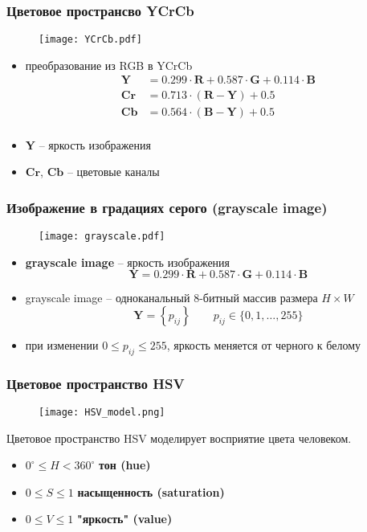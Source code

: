 \documentclass[
    12pt, 
    usepdftitle=false,
    aspectratio=1610
]{beamer}
\begin{document}
\begin{frame}
\frametitle{Цветовое пространсво YCrCb}
\begin{figure}
    \centering
    \texttt{[image: YCrCb.pdf]}
\end{figure}
\begin{itemize}
    \item преобразование из RGB в YCrCb
    \begin{align*}
        \mathbf{Y}  &= 0.299\cdot \mathbf{R} + 0.587\cdot \mathbf{G} + 0.114\cdot \mathbf{B} \\
        \mathbf{Cr} &= 0.713 \cdot (\mathbf{R} - \mathbf{Y}) + 0.5 \\
        \mathbf{Cb} &= 0.564 \cdot (\mathbf{B} - \mathbf{Y}) + 0.5 \\
    \end{align*}
    \item $\mathbf{Y}$ -- яркость изображения 
    \item $\mathbf{Cr}$, $\mathbf{Cb}$ -- цветовые каналы
\end{itemize}
\end{frame}

\begin{frame}
\frametitle{Изображение в градациях серого (grayscale image)}
\begin{figure}
    \centering
    \texttt{[image: grayscale.pdf]}
\end{figure}
\begin{itemize}
    \item \textbf{grayscale image} -- яркость изображения
    $$
        \mathbf{Y} = 0.299\cdot \mathbf{R} + 0.587\cdot \mathbf{G} + 0.114\cdot \mathbf{B}
    $$
    \item grayscale image -- одноканальный 8-битный массив размера $H\times W$
    $$
        \mathbf{Y}=\left\{p_{ij}\right\}\qquad
        p_{ij}\in\{0,1,\ldots,255\}
    $$
    \item при изменении $0\leqslant p_{ij}\leqslant 255$, яркость меняется от черного к белому
\end{itemize}
\end{frame}

\begin{frame}
\frametitle{Цветовое пространство HSV}
\begin{figure}
    \centering
    \texttt{[image: HSV\_model.png]}
\end{figure}
Цветовое пространство HSV моделирует восприятие цвета человеком.
\begin{itemize}
    \item $0^\circ \leqslant H < 360^\circ$  \textbf{тон (hue)}
    \item $0\leqslant S \leqslant 1$  \textbf{насыщенность (saturation)}
    \item $0\leqslant V \leqslant 1$  \textbf{"яркость" (value)}
\end{itemize}
\end{frame}
\end{document}
